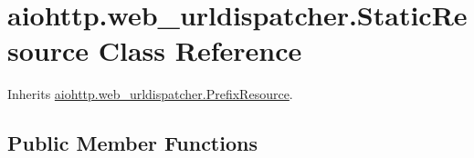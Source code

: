 \hypertarget{classaiohttp_1_1web__urldispatcher_1_1_static_resource}{}\section{aiohttp.\+web\+\_\+urldispatcher.\+Static\+Resource Class Reference}
\label{classaiohttp_1_1web__urldispatcher_1_1_static_resource}


Inherits \hyperlink{classaiohttp_1_1web__urldispatcher_1_1_prefix_resource}{aiohttp.\+web\+\_\+urldispatcher.\+Prefix\+Resource}.

\subsection*{Public Member Functions}
